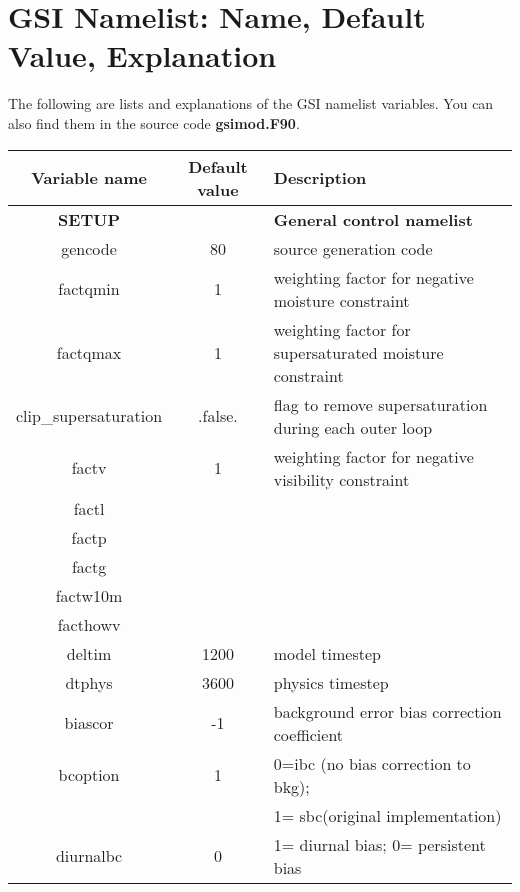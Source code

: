 \chapter{GSI Namelist: Name, Default Value, Explanation}
The following are lists and explanations of the GSI namelist variables. You can also find them in the source code \textbf{gsimod.F90}. 

\begin{table}[h]
\footnotesize
 \center
  \begin{tabular}{| c | c | p{9cm} |}
  \hline
  Variable name & Default value & Description \\
  \hline
  \textbf{SETUP} &   & \textbf{General control namelist} \\
  \hline
  gencode & 80 & source generation code \\
  \hline
  factqmin & 1 & weighting factor for negative moisture constraint \\
  \hline
  factqmax & 1 & weighting factor for supersaturated moisture constraint \\
  \hline
  clip\_supersaturation	& .false. & flag to remove supersaturation during each outer loop \\
  \hline 
  factv & 1 & weighting factor for negative visibility constraint \\
  \hline
  factl & &  \\
  \hline
  factp & &  \\
  \hline
  factg & &  \\
  \hline
  factw10m & &  \\
  \hline
  facthowv & & \\
  \hline
  deltim & 1200 & model timestep \\
  \hline
  dtphys & 3600 & physics timestep \\
  \hline
  biascor & -1 & background error bias correction coefficient \\
  \hline
  bcoption & 1 & 0=ibc (no bias correction to bkg); \\
               & & 1= sbc(original implementation) \\
  \hline
  diurnalbc	& 0 & 1= diurnal bias; 0= persistent bias \\
  \hline
    \end{tabular}
\end{table}

